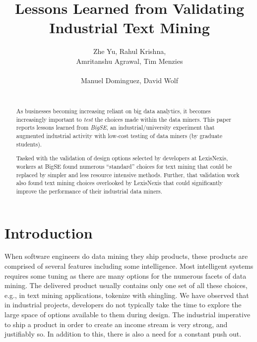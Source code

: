 \documentclass{sig-alternate-05-2015}
\begin{document}

\title{Lessons Learned from Validating  Industrial Text Mining  }
\author{
\alignauthor
Zhe Yu, Rahul Krishna, \\ Amritanshu Agrawal, Tim Menzies\\ %
       \\
\alignauthor
Manuel Dominguez,  David Wolf \\%
       \\
}
\maketitle


\begin{abstract}

As businesses becoming increasing reliant on big data   analytics, it becomes
increasingly important to {\em test} the choices made within the data miners.
This paper reports   lessons learned from  {\em BigSE}, an industrial/university
experiment that augmented industrial activity with low-cost testing
of data miners (by  graduate students).  

Tasked with the validation of design options selected by developers at LexisNexis, workers
at BigSE found numerous ``standard'' choices for
text mining that could be replaced by  simpler and less resource intensive methods. Further, that validation work also found text mining choices overlooked
by LexisNexis that could significantly improve the performance of their
industrial data miners.
\end{abstract}



\section{Introduction}


When software engineers do data mining they ship products, these products are comprised of several features including some intelligence. Most intelligent systems requires some tuning as there are many options for the numerous facets of data mining. The delivered product usually contains only one set of all these choices, e.g., in text mining applications, tokenize with shingling. We have observed that in industrial projects, developers do not typically take the time to explore the large space of options available to them during design. The industrial imperative to ship a product in order to create an income stream is very strong, and justifiably so. In addition to this, there is also a need for a constant push out. 
\end{document}
